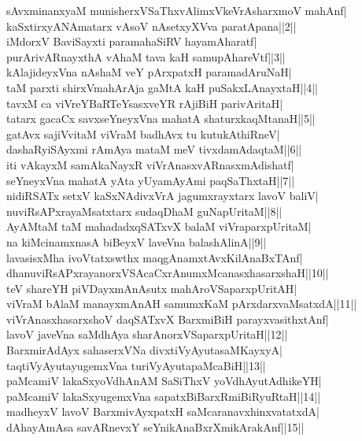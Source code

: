 \documentclass{article}
\begin{document}
sAvxminanxyaM munisherxVSaThxvAlimxVkeVrAsharxmoV mahAnf|\\
kaSxtirxyANAmatarx vAsoV nAsetxyXVva paratApana||2||\\
iMdorxV BaviSayxti paramahaSiRV hayamAharatf|\\
purArivARnayxthA vAhaM tava kaH samupAhareVtf||3||\\
kAlajideyxVna nAshaM veY pArxpatxH paramadAruNaH|\\
taM parxti shirxVmahArAja gaMtA kaH puSakxLAnayxtaH||4||\\
tavxM ca viVreYBaRTeYsasxveYR rAjiBiH parivAritaH|\\
tatarx gacaCx savxseYneyxVna mahatA shaturxkaqMtanaH||5||\\
gatAvx sajiVvitaM viVraM badhAvx tu kutukAthiRneV|\\
dashaRyiSAyxmi rAmAya mataM meV tivxdamAdaqtaM||6||\\
iti vAkayxM samAkaNayxR viVrAnasxvARnasxmAdishatf|\\
seYneyxVna mahatA yAta yUyamAyAmi paqSaThxtaH||7||\\
nidiRSATx setxV kaSxNAdivxVrA jagumxrayxtarx lavoV baliV|\\
nuviRsAPxrayaMsatxtarx sudaqDhaM guNapUritaM||8||\\
AyAMtaM taM mahadadxqSATxvX balaM viVraparxpUritaM|\\
na kiMcinamxnasA biBeyxV laveVna balashAlinA||9||\\
lavasisxMha ivoVtatxswthx maqgAnamxtAvxKilAnaBxTAnf|\\
dhanuviRsAPxrayanorxVSAcaCxrAnumxMcanasxhasarxshaH||10||\\
teV shareYH piVDayxmAnAsutx mahAroVSaparxpUritAH|\\
viVraM bAlaM manayxmAnAH samumxKaM pArxdarxvaMsatxdA||11||\\
viVrAnasxhasarxshoV daqSATxvX BarxmiBiH parayxvasithxtAnf|\\
lavoV javeVna saMdhAya sharAnorxVSaparxpUritaH||12||\\
BarxmirAdAyx sahaserxVNa divxtiVyAyutasaMKayxyA|\\
taqtiVyAyutayugemxVna turiVyAyutapaMcaBiH||13||\\
paMcamiV lakaSxyoVdhAnAM SaSiThxV yoVdhAyutAdhikeYH|\\
paMcamiV lakaSxyugemxVna sapatxBiBarxRmiBiRyuRtaH||14||\\
madheyxV lavoV BarxmivAyxpatxH saMcaranavxhinxvatatxdA|\\
dAhayAmAsa savARnevxY seYnikAnaBxrXmikArakAnf||15||\\
\end{document}
